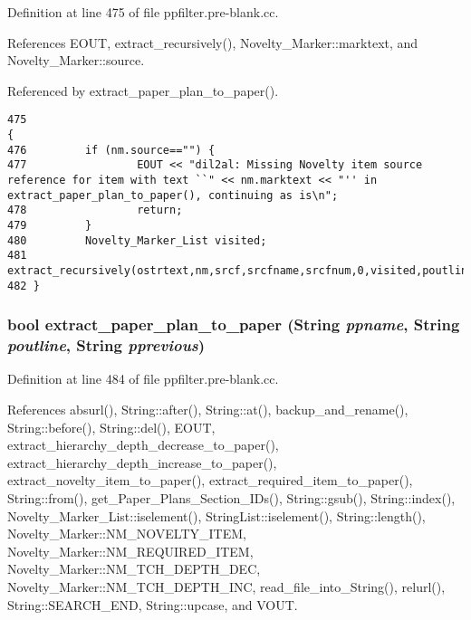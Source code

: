 Definition at line 475 of file ppfilter.pre-blank.cc.

References EOUT, extract\_\-recursively(), Novelty\_\-Marker::marktext, and Novelty\_\-Marker::source.

Referenced by extract\_\-paper\_\-plan\_\-to\_\-paper().



\footnotesize\begin{verbatim}475                                                                                                                                                                            {
476         if (nm.source=="") {
477                 EOUT << "dil2al: Missing Novelty item source reference for item with text ``" << nm.marktext << "'' in extract_paper_plan_to_paper(), continuing as is\n";
478                 return;
479         }
480         Novelty_Marker_List visited;
481         extract_recursively(ostrtext,nm,srcf,srcfname,srcfnum,0,visited,poutline,pprevtext);
482 }
\end{verbatim}\normalsize 
{}
\subsubsection{\setlength{\rightskip}{0pt plus 5cm}bool extract\_\-paper\_\-plan\_\-to\_\-paper ({\bf String} {\em ppname}, {\bf String} {\em poutline}, {\bf String} {\em pprevious})}\label{ppfilter_8pre-blank_8cc_a14}




Definition at line 484 of file ppfilter.pre-blank.cc.

References absurl(), String::after(), String::at(), backup\_\-and\_\-rename(), String::before(), String::del(), EOUT, extract\_\-hierarchy\_\-depth\_\-decrease\_\-to\_\-paper(), extract\_\-hierarchy\_\-depth\_\-increase\_\-to\_\-paper(), extract\_\-novelty\_\-item\_\-to\_\-paper(), extract\_\-required\_\-item\_\-to\_\-paper(), String::from(), get\_\-Paper\_\-Plans\_\-Section\_\-IDs(), String::gsub(), String::index(), Novelty\_\-Marker\_\-List::iselement(), String\-List::iselement(), String::length(), Novelty\_\-Marker::NM\_\-NOVELTY\_\-ITEM, Novelty\_\-Marker::NM\_\-REQUIRED\_\-ITEM, Novelty\_\-Marker::NM\_\-TCH\_\-DEPTH\_\-DEC, Novelty\_\-Marker::NM\_\-TCH\_\-DEPTH\_\-INC, read\_\-file\_\-into\_\-String(), relurl(), String::SEARCH\_\-END, String::upcase, and VOUT.

